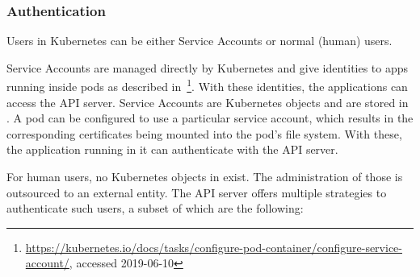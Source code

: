 \subsubsection{Authentication} \label{ssec:authentication}

Users in Kubernetes can be either Service Accounts or normal (human) users. 

Service Accounts are managed directly by Kubernetes and give identities to apps running inside pods as described in~\textcite{k8sdocs}\footnote{\url{https://kubernetes.io/docs/tasks/configure-pod-container/configure-service-account/}, accessed 2019-06-10}. With these identities, the applications can access the API server. Service Accounts are Kubernetes objects and are stored in . A pod can be configured to use a particular service account, which results in the corresponding certificates being mounted into the pod's file system. With these, the application running in it can authenticate with the API server. 

For human users, no Kubernetes objects in  exist. The administration of those is outsourced to an external entity. The API server offers multiple strategies to authenticate such users, a subset of which are the following:

